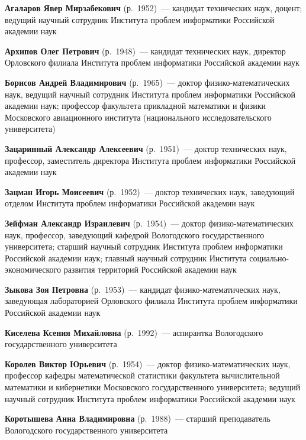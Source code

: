 \begin{multicols}{2}

\noindent
\textbf{Агаларов Явер Мирзабекович} (р.\ 1952)~---
кандидат технических наук, доцент; ведущий научный сотрудник Института проблем информатики Российской академии наук


\noindent
\textbf{Архипов Олег Петрович} (р.\ 1948)~---
кандидат технических наук, директор Орловского филиала Института проблем информатики Российской академии наук

\noindent
\textbf{Борисов Андрей Владимирович} (р.\ 1965)~---
  доктор фи\-зи\-ко-ма\-те\-ма\-ти\-че\-ских наук, ведущий научный сотрудник Института проблем информатики Российской академии наук; профессор факультета прикладной математики и физики Московского авиационного института (национального исследовательского университета)

  \noindent
\textbf{Зацаринный Александр Алексеевич} (р.\ 1951)~---
доктор технических наук, профессор, заместитель директора Института проблем информатики Российской академии наук

  \noindent
\textbf{Зацман Игорь Моисеевич} (р.\ 1952)~---
  доктор технических наук, заведующий отделом Института проб\-лем информатики Российской академии наук

  \noindent
\textbf{Зейфман Александр Израилевич} (р.\ 1954)~---
доктор фи\-зи\-ко-ма\-те\-ма\-ти\-че\-ских наук, профессор, заведующий кафедрой
Вологодского государственного университета; старший научный сотрудник
Института проблем информатики Российской академии наук; главный научный
сотрудник Института со\-ци\-аль\-но-эко\-но\-ми\-че\-ско\-го развития
территорий Российской академии наук

  \noindent
\textbf{Зыкова Зоя Петровна} (р.\ 1953)~---
кандидат фи\-зи\-ко-ма\-те\-ма\-ти\-че\-ских наук,
заведующая лабораторией Орловского филиала Института проблем информатики Российской академии наук

\noindent
\textbf{Киселева Ксения Михайловна} (р.\ 1992)~--- аспирантка Вологодского государственного университета

\noindent
\textbf{Королев Виктор Юрьевич} (р.\ 1954)~--- доктор
фи\-зи\-ко-ма\-те\-ма\-ти\-че\-ских наук, профессор кафедры математической
статистики факультета вычисли\-тельной математики и кибернетики
Московского государственного университета;
ведущий научный сотрудник Института проб\-лем информатики
Российской академии наук

\noindent
\textbf{Коротышева Анна Владимировна} (р.\ 1988)~---
старший преподаватель Вологодского государственного университета



\end{multicols}
